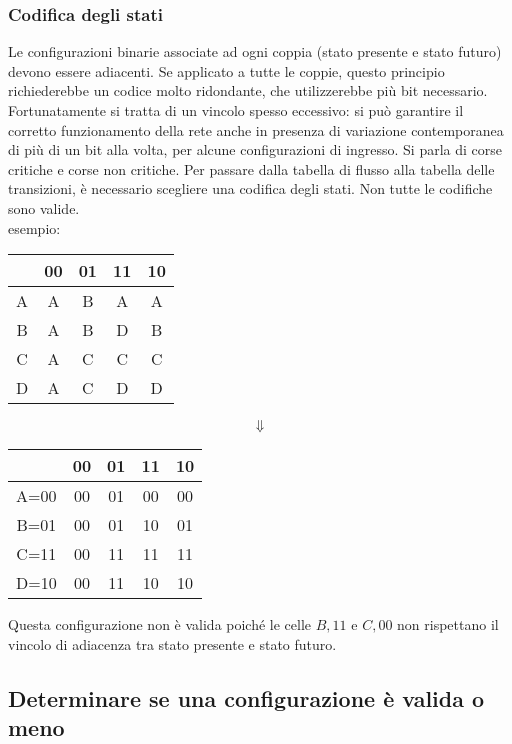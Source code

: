 \documentclass{article}
\begin{document}
\subsubsection{Codifica degli stati}

Le configurazioni binarie associate ad ogni coppia (stato presente e stato futuro) devono essere adiacenti.
Se applicato a tutte le coppie, questo principio richiederebbe un codice molto ridondante, che utilizzerebbe più bit necessario.
Fortunatamente si tratta di un vincolo spesso eccessivo: si può garantire il corretto funzionamento della rete anche in presenza di variazione contemporanea di più di un bit alla volta, per alcune configurazioni di ingresso.
Si parla di corse critiche e corse non critiche.
Per passare dalla tabella di flusso alla tabella delle transizioni, è necessario scegliere una codifica degli stati.
Non tutte le codifiche sono valide.\\

\noindent
esempio:

\begin{center}
\begin{tabular}{ |c|c|c|c|c| }
\hline
& 00 & 01 & 11 & 10 \\
\hline
\hline
A & A & B & A & A \\
B & A & B & D & B \\
C & A & C & C & C \\
D & A & C & D & D \\
\hline
\end{tabular}

$$\Downarrow$$

\begin{tabular}{ |c|c|c|c|c| }
\hline
& 00 & 01 & 11 & 10 \\
\hline
\hline
A=00 & 00 & 01 & 00 & 00 \\
B=01 & 00 & 01 & 10 & 01 \\
C=11 & 00 & 11 & 11 & 11 \\
D=10 & 00 & 11 & 10 & 10 \\
\hline
\end{tabular}
\end{center}

\noindent
Questa configurazione non è valida poiché le celle $B,11$ e $C,00$ non rispettano il vincolo di adiacenza tra stato presente e stato futuro.

\subsection{Determinare se una configurazione è valida o meno}
\end{document}
